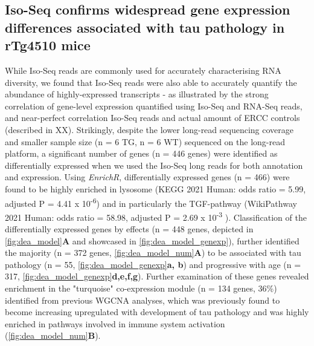 \subsection{Iso-Seq confirms widespread gene expression differences associated with tau pathology in rTg4510 mice}
While Iso-Seq reads are commonly used for accurately characterising RNA diversity, we found that Iso-Seq reads were also able to accurately quantify the abundance of highly-expressed transcripts - as illustrated by the strong correlation of gene-level expression quantified using Iso-Seq and RNA-Seq reads, and near-perfect correlation Iso-Seq reads and actual amount of ERCC controls (described in XX). Strikingly, despite the lower long-read sequencing coverage and smaller sample size (n = 6 TG, n = 6 WT) sequenced on the long-read platform, a significant number of genes (n = 446 genes) were identified as differentially expressed when we used the Iso-Seq long reads for both annotation and expression. Using \textit{EnrichR}, differentially expressed genes (n = 466) were found to be highly enriched in lysosome (KEGG 2021 Human: odds ratio = 5.99, adjusted P = 4.41 x 10\textsuperscript{-6}) and in particularly the TGF-\textbeta pathway (WikiPathway 2021 Human: odds ratio = 58.98, adjusted P = 2.69 x 10\textsuperscript{-3} ). Classification of the differentially expressed genes by effects (n = 448 genes, depicted in \cref{fig:dea_model}\textbf{A} and showcased in \cref{fig:dea_model_genexp}), further identified the majority (n = 372 genes, \cref{fig:dea_model_num}\textbf{A}) to be associated with tau pathology (n = 55, \cref{fig:dea_model_genexp}\textbf{a, b}) and progressive with age (n = 317, \cref{fig:dea_model_genexp}\textbf{d,e,f,g}). Further examination of these genes revealed enrichment in the "turquoise" co-expression module (n = 134 genes, 36\%) identified from previous WGCNA analyses, which was previously found to become increasing upregulated with development of tau pathology and was highly enriched in pathways involved in immune system activation\cite{Castanho2020} (\cref{fig:dea_model_num}\textbf{B}).  
 
